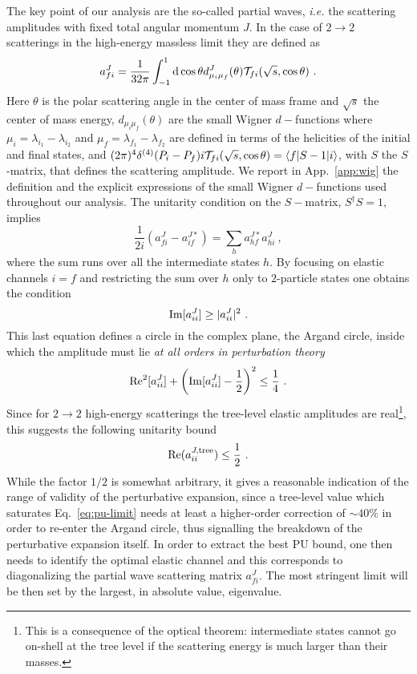 \documentclass[a4paper,11pt]{article}
\newcommand{\be}{\begin{equation}}
\newcommand{\ee}{\end{equation}}
\begin{document}
The key point of our analysis are the so-called partial waves, {\emph{i.e.}} the scattering amplitudes with fixed total angular momentum $J$. In the case of $2\to 2$ scatterings in the high-energy massless limit they are defined as~\cite{Jacob:1959at} 
\be\label{eq:partial_waves}
a_{fi}^J = \frac{1}{32\pi}\int_{-1}^1 {\rm d}\cos\theta d_{\mu_i\mu_f}^J(\theta) {\cal T}_{fi}({\sqrt s, \cos\theta}) \ .
\ee
Here $\theta$ is the polar scattering angle in the center of mass frame and $\sqrt s$ the center of mass energy, $d_{\mu_i\mu_f}(\theta)$ are the small Wigner $d-$functions where $\mu_i=\lambda_{i_1}-\lambda_{i_2}$ and $\mu_f=\lambda_{f_1}-\lambda_{f_2}$ are defined in terms of the helicities of the initial and final states, and $(2\pi)^4\delta^{(4)}(P_i -P_f)i {\cal T}_{fi}(\sqrt s, \cos\theta)=\langle f| S-1| i \rangle$, with $S$ the $S$-matrix, that defines the scattering amplitude. We report in App.~\ref{app:wig} the definition and the explicit expressions of the small Wigner $d-$functions used throughout our analysis. The unitarity condition on the $S-$matrix, $S^\dag S = 1$, implies 
\be
\frac{1}{2i} (a_{fi}^J-a_{if}^{J*})=\sum_h a_{hf}^{J*}a_{hi}^J \ ,
\ee
where the sum runs over all the intermediate states $h$. By focusing on elastic channels $i=f$ and restricting the sum over $h$ only to $2$-particle states one obtains the condition
\be
{\rm Im}[a_{ii}^J] \ge |a_{ii}^J|^2 \ .
\ee
This last equation defines a circle in the complex plane, the Argand circle, inside which the amplitude must lie {\emph{at all orders in perturbation theory}}
\be
{\rm Re}^2[a_{ii}^J] +\left({\rm Im}[a_{ii}^J]-\frac{1}{2}\right)^2 \le \frac{1}{4} \ .
\ee
Since for $2\to 2$ high-energy scatterings the tree-level elastic amplitudes are real\footnote{This is a consequence of the optical theorem: intermediate states cannot go on-shell at the tree level if the scattering energy is much larger than their masses.}, this suggests the following unitarity bound
\be\label{eq:pu-limit}
{\rm Re}(a_{ii}^{J,{\rm tree}}) \le \frac{1}{2} \ .
\ee
While the factor $1/2$ is somewhat arbitrary, it gives a reasonable indication of the range of validity of the perturbative expansion, since a tree-level value which saturates Eq.~\eqref{eq:pu-limit} needs at least a higher-order correction of $\sim 40\%$ in order to re-enter the Argand circle, thus signalling the breakdown of the perturbative expansion itself. In order to extract the best PU bound, one then needs to identify the optimal elastic channel and this corresponds to 
diagonalizing the partial wave scattering matrix $a^J_{fi}$. The most stringent limit will be then set by the largest, in absolute value, eigenvalue.
\end{document}
